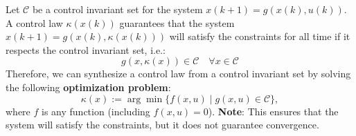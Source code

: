 Let $\mathcal{C}$ be a control invariant set for the system $x(k + 1) = g(x(k), u(k))$.
\newpar{}
A control law $\kappa(x(k))$ guarantees that the system $x(k + 1) = g(x(k), \kappa(x(k)))$ will satisfy the constraints for all time if it respects the control invariant set, i.e.:
\begin{equation*}
    g(x, \kappa(x)) \in \mathcal{C} \quad \forall x \in \mathcal{C}
\end{equation*}
Therefore, we can synthesize a control law from a control invariant set by solving the following \textbf{optimization problem}:
\begin{equation*}
    \kappa(x) := \arg\min \{ f(x, u) \mid g(x, u) \in \mathcal{C} \},
\end{equation*}
where $f$ is any function (including $f(x, u) = 0$).
\newpar{}
\textbf{Note}: This ensures that the system will satisfy the constraints, but it does not guarantee convergence.



